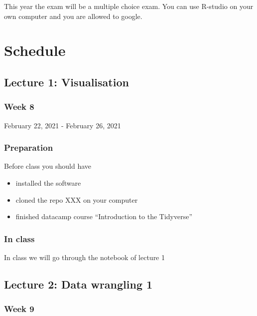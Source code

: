 \documentclass[
]{book}
\providecommand{\tightlist}{%
  \setlength{\itemsep}{0pt}\setlength{\parskip}{0pt}}
\begin{document}
This year the exam will be a multiple choice exam. You can use R-studio on your own computer and you are allowed to google.

\hypertarget{schedule}{%
\chapter{Schedule}\label{schedule}}

\hypertarget{lecture-1-visualisation}{%
\section{Lecture 1: Visualisation}\label{lecture-1-visualisation}}

\hypertarget{week-8}{%
\subsection{Week 8}\label{week-8}}

February 22, 2021 - February 26, 2021

\hypertarget{preparation}{%
\subsection{Preparation}\label{preparation}}

Before class you should have

\begin{itemize}
\tightlist
\item
  installed the software
\item
  cloned the repo XXX on your computer
\item
  finished datacamp course ``Introduction to the Tidyverse''
\end{itemize}

\hypertarget{in-class}{%
\subsection{In class}\label{in-class}}

In class we will go through the notebook of lecture 1

\hypertarget{lecture-2-data-wrangling-1}{%
\section{Lecture 2: Data wrangling 1}\label{lecture-2-data-wrangling-1}}

\hypertarget{week-9}{%
\subsection{Week 9}\label{week-9}}
\end{document}
